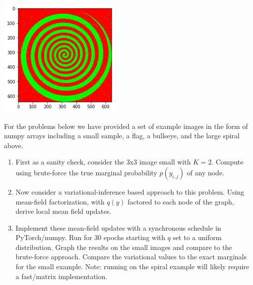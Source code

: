 \documentclass{harvardml}
\theoremstyle{plain}
\begin{document}
\begin{center}
  \includegraphics[width=6cm]{spiral}
\end{center}



\newpage

\begin{problem}

\noindent For the problems below we have provided a set of example images in
the form of numpy arrays including a small sample, a flag, a bullseye,
and the large spiral above.

\begin{enumerate}


\item First as a sanity check, consider  the 3x3 image small with $K=2$. Compute using brute-force the
  true marginal probability $p(y_{i,j})$ of any node.

\item Now consider a variational-inference based approach to this
  problem. Using mean-field factorization, with $q(y)$ factored to
each node of the graph, derive local mean field updates.

\begin{center}
\end{center}


\item Implement these mean-field updates with a synchronous
  schedule in PyTorch/numpy. Run for 30 epochs starting with $q$ set
  to a uniform distribution. Graph the results on the small images and
  compare to the brute-force approach. Compare the variational values
  to the exact marginals for the small example. Note: running on the
  spiral example will likely require a fast/matrix implementation.


\end{enumerate}
\end{problem}
\end{document}
